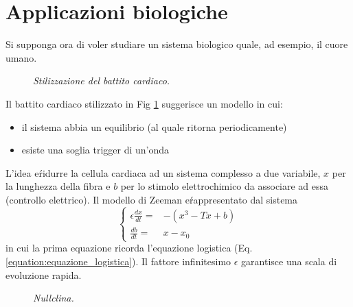 \documentclass[12pt, a4paper]{book}
\theoremstyle{theorem}
\begin{document}
		\section{Applicazioni biologiche}
			Si supponga ora di voler studiare un sistema biologico quale, ad esempio, il cuore umano.
			\begin{figure}[H]
				\centering
				\caption{\emph{Stilizzazione del battito cardiaco.}}
				\label{figure:battito_cardiaco}
			\end{figure}
			Il battito cardiaco stilizzato in Fig \ref{figure:battito_cardiaco} suggerisce un modello in cui:
			\begin{itemize}
				\item il sistema abbia un equilibrio (al quale ritorna periodicamente)
				\item esiste una soglia trigger di un'onda 
			\end{itemize}
			L'idea e\' ridurre la cellula cardiaca ad un sistema complesso a due variabile, $x$ per la lunghezza della fibra e $b$ per lo stimolo elettrochimico da associare ad essa (controllo elettrico).
			Il modello di Zeeman e\' rappresentato dal sistema
			\begin{equation}
				\begin{cases}
					\epsilon\frac{dx}{dt}=&-\left(x^3-Tx+b\right)\\
					\frac{db}{dt}=&x-x_{0}
				\end{cases}
			\end{equation}
			in cui la prima equazione ricorda l'equazione logistica (Eq. \ref{equation:equazione_logistica}).
			Il fattore infinitesimo $\epsilon$ garantisce una scala di evoluzione rapida.
			\begin{figure}[H]
				\centering
				\caption{\emph{Nullclina.}}
				\label{figure:nullcline}
			\end{figure}
\end{document}
